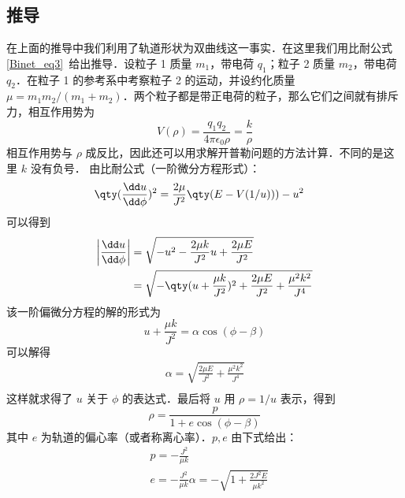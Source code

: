 \subsection{推导}
在上面的推导中我们利用了轨道形状为双曲线这一事实．在这里我们用比耐公式\autoref{Binet_eq3}~给出推导．设粒子 1 质量 $m_1$，带电荷 $q_1$；粒子 2 质量 $m_2$，带电荷 $q_2$．在粒子 1 的参考系中考察粒子 2 的运动，并设约化质量 $\mu=m_1m_2/(m_1+m_2)$．两个粒子都是带正电荷的粒子，那么它们之间就有排斥力，相互作用势为
\begin{equation}
V(\rho)=\frac{q_1q_2}{4\pi\epsilon_0\rho}=\frac{k}{\rho}
\end{equation}
相互作用势与 $\rho$ 成反比，因此还可以用求解开普勒问题的方法计算．不同的是这里 $k$ 没有负号．
由比耐公式（一阶微分方程形式）：
\begin{equation}
\begin{aligned}
&\qty(\frac{\dd u}{\dd \phi})^2=\frac{2\mu}{J^2}\qty(E-V(1/u)))-u^2
\end{aligned}
\end{equation}
可以得到
\begin{equation}
\begin{aligned}
\left|\frac{\dd u}{\dd \phi}\right|&=\sqrt{-u^2-\frac{2\mu k}{J^2}u+\frac{2\mu E}{J^2}}\\
&=\sqrt{-\qty(u+\frac{\mu k}{J^2})^2+\frac{2\mu E}{J^2}+\frac{\mu^2 k^2}{J^4}}
\end{aligned}
\end{equation}
该一阶偏微分方程的解的形式为
\begin{equation}
u+\frac{\mu k}{J^2}=\alpha\cos(\phi-\beta)
\end{equation}
可以解得
\begin{equation}
\begin{aligned}
\alpha=\sqrt{\frac{2\mu E}{J^2}+\frac{\mu^2 k^2}{J^4}}\\
\end{aligned}
\end{equation}
这样就求得了 $u$ 关于 $\phi$ 的表达式．最后将 $u$ 用 $\rho=1/u$ 表示，得到
\begin{equation}
\rho=\frac{p}{1+e\cos(\phi-\beta)}
\end{equation}
其中 $e$ 为轨道的偏心率（或者称离心率）．$p,e$ 由下式给出：
\begin{equation}
\begin{aligned}
&p=-\frac{J^2}{\mu k}\\
&e=-\frac{J^2}{\mu k}\alpha=-\sqrt{1+\frac{2J^2E}{\mu k^2}}
\end{aligned}
\end{equation}
